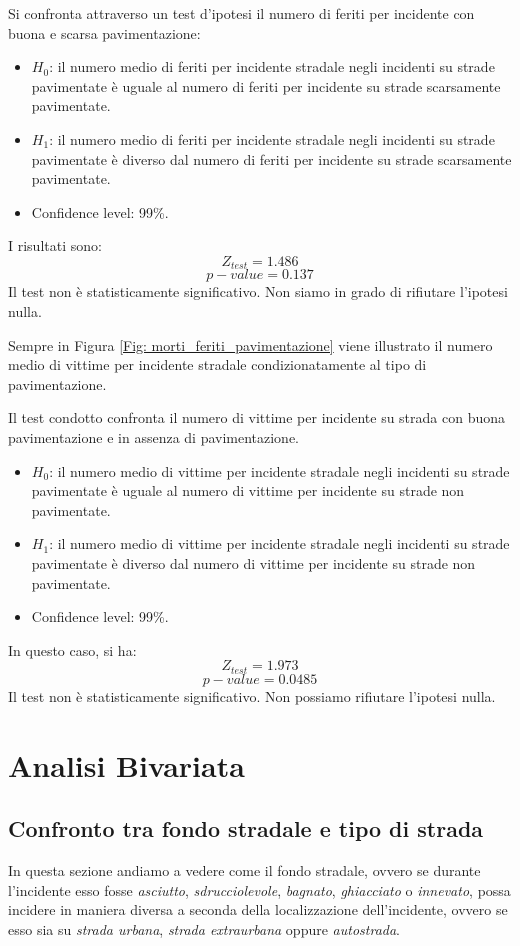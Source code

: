 \documentclass[12pt,a4paper,final,oneside]{article}			%
\begin{document}
        Si confronta attraverso un test d’ipotesi il numero di feriti per incidente con buona e scarsa pavimentazione:
        \begin{itemize}
            \item $H_0$: il numero medio di feriti per incidente stradale negli incidenti su strade pavimentate è uguale al numero di feriti per incidente su strade scarsamente pavimentate.
            \item $H_1$: il numero medio di feriti per incidente stradale negli incidenti su strade pavimentate è diverso  dal numero di feriti per incidente su strade scarsamente pavimentate.
            \item Confidence level: 99\%.
        \end{itemize}
        I risultati sono:
        \[
            Z_{test} = 1.486
        \]
        \[
            p-value = 0.137
        \]
        Il test non è statisticamente significativo. Non siamo in grado di rifiutare l’ipotesi nulla.
        
        Sempre in Figura \ref{Fig: morti_feriti_pavimentazione} viene illustrato il numero medio di vittime per incidente stradale condizionatamente al tipo di pavimentazione.
        
        Il test condotto confronta il numero di vittime per incidente su strada con buona pavimentazione e in assenza di pavimentazione.
        \begin{itemize}
            \item $H_0$: il numero medio di vittime per incidente stradale negli incidenti su strade pavimentate è uguale al numero di vittime per incidente su strade non pavimentate.
            \item $H_1$: il numero medio di vittime per incidente stradale negli incidenti su strade pavimentate è diverso  dal numero di vittime per incidente su strade non pavimentate.
            \item Confidence level: 99\%. 
        \end{itemize}
        In questo caso, si ha:
        \[
            Z_{test} = 1.973
        \]
        \[
            p-value = 0.0485
        \]
        Il test non è statisticamente significativo. Non possiamo rifiutare l’ipotesi nulla.
\clearpage

\section{Analisi Bivariata}
    \subsection{Confronto tra fondo stradale e tipo di strada}
        In questa sezione andiamo a vedere come il fondo stradale, ovvero se durante l'incidente esso fosse \textit{asciutto}, \textit{sdrucciolevole}, \textit{bagnato}, \textit{ghiacciato} o \textit{innevato}, possa incidere in maniera diversa a seconda della localizzazione dell'incidente, ovvero se esso sia su \textit{strada urbana}, \textit{strada extraurbana} oppure \textit{autostrada}.
    
\end{document}
